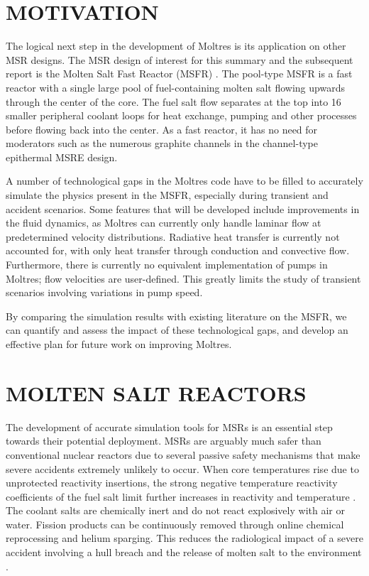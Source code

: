 \documentclass{anstrans}
\begin{document}
\section{MOTIVATION}

The logical next step in the development of Moltres is its application on other MSR designs. The MSR design of interest for this summary and the subsequent report is the Molten Salt Fast Reactor (MSFR) \cite{serp_molten_2014}. The pool-type MSFR is a fast reactor with a single large pool of fuel-containing molten salt flowing upwards through the center of the core. The fuel salt flow separates at the top into 16 smaller peripheral coolant loops for heat exchange, pumping and other processes before flowing back into the center. As a fast reactor, it has no need for moderators such as the numerous graphite channels in the channel-type epithermal MSRE design.

A number of technological gaps in the Moltres code have to be filled to accurately simulate the physics present in the MSFR, especially during transient and accident scenarios. Some features that will be developed include improvements in the fluid dynamics, as Moltres can currently only handle laminar flow at predetermined velocity distributions. Radiative heat transfer is currently not accounted for, with only heat transfer through conduction and convective flow. Furthermore, there is currently no equivalent implementation of pumps in Moltres; flow velocities are user-defined. This greatly limits the study of transient scenarios involving variations in pump speed. 

By comparing the simulation results with existing literature on the MSFR, we can quantify and assess the impact of these technological gaps, and develop an effective plan for future work on improving Moltres.

\section{MOLTEN SALT REACTORS}


The development of accurate simulation tools for MSRs is an essential step towards their potential deployment. MSRs are arguably much safer than conventional nuclear reactors due to several passive safety mechanisms that make severe accidents extremely unlikely to occur. When core temperatures rise due to unprotected reactivity insertions, the strong negative temperature reactivity coefficients of the fuel salt limit further increases in reactivity and temperature \cite{elsheikh_safety_2013}. The coolant salts are chemically inert and do not react explosively with air or water. Fission products can be continuously removed through online chemical reprocessing and helium sparging. This reduces the radiological impact of a severe accident involving a hull breach and the release of molten salt to the environment \cite{elsheikh_safety_2013}.
\end{document}
